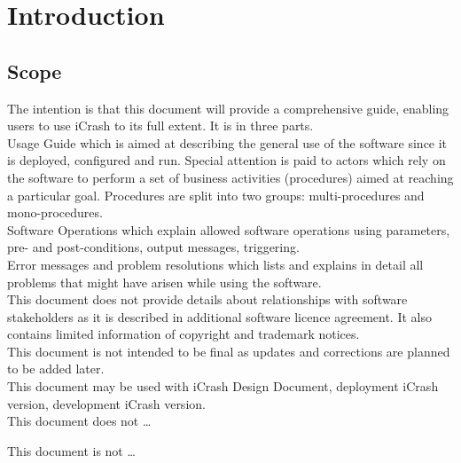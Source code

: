 \chapter{Introduction}
\label{chap:introduction}


\section{Scope}
The intention is that this document will provide a comprehensive guide, enabling
users to use iCrash to its full extent. It is in three parts.\\

Usage Guide which is aimed at describing the general use of the software since
it is deployed, configured and run. Special attention is paid to actors which
rely on the software to perform a set of business activities (procedures) aimed at reaching a particular goal. Procedures are split into two groups: multi-procedures and mono-procedures.\\

Software Operations which explain allowed software operations using parameters,
pre- and post-conditions, output messages, triggering.\\

Error messages and problem resolutions which lists and explains in detail all
problems that might have arisen while using the software. \\

This document does not provide details about relationships with software
stakeholders as it is described in additional software licence agreement. It
also contains limited information of copyright and trademark notices.\\

This document is not intended to be final as updates and corrections are planned
to be added later. \\

This document may be used with iCrash Design Document, deployment iCrash
version, development iCrash version.\\




This document does not \ldots 
 
This document is not \ldots

